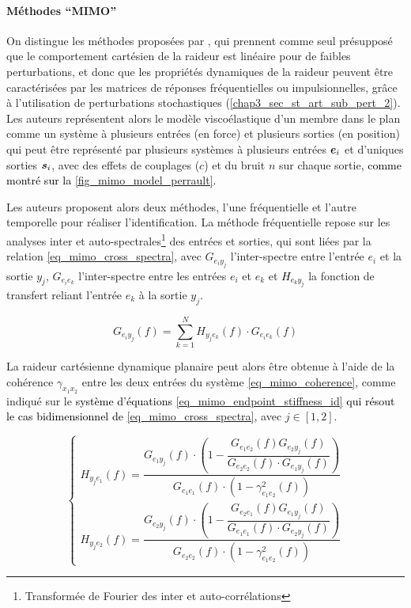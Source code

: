 \paragraph{Méthodes \foreignquote{french}{MIMO} }

On distingue les méthodes proposées par \textcite{perreault_multiple-input_1999,perreault_effects_2001}, qui prennent comme seul présupposé que le comportement cartésien de la raideur est linéaire pour de faibles perturbations, et donc que les propriétés dynamiques de la raideur peuvent être caractérisées par les matrices de réponses fréquentielles ou impulsionnelles, grâce à l'utilisation de perturbations stochastiques (\cref{chap3_sec_st_art_sub_pert_2}). Les auteurs représentent alors le modèle viscoélastique d'un membre dans le plan comme un système à plusieurs entrées (en force) et plusieurs sorties (en position) qui peut être représenté par plusieurs systèmes à plusieurs entrées $\vect{e}_i$ et d'uniques sorties $\vect{s}_i$, avec des effets de couplages ($c$) et du bruit $n$ sur chaque sortie\textcolor{black}{, comme montré sur la \cref{fig_mimo_model_perrault}.}

\tikzexternalenable


Les auteurs proposent alors deux méthodes, l'une fréquentielle et l'autre temporelle pour réaliser l'identification. La méthode fréquentielle repose sur les analyses inter et auto-spectrales\footnote{Transformée de Fourier des inter et auto-corrélations} des entrées et sorties, qui sont liées par la relation \cref{eq_mimo_cross_spectra}, avec $G_{e_iy_j}$ l'inter-spectre entre l'entrée $e_i$ et la sortie $y_j$, $G_{e_ie_k}$ l'inter-spectre entre les entrées $e_i$ et $e_k$ et \textcolor{black}{$H_{e_ky_j}$} la fonction de transfert reliant l'entrée $e_k$ à la sortie $y_j$. 

\begin{equation}\label{eq_mimo_cross_spectra}
G_{e_iy_j}(f) = \sum_{k=1}^{N}H_{y_je_k}(f)\cdot G_{e_ie_k}(f)
\end{equation}

La raideur cartésienne dynamique planaire peut alors être obtenue à l'aide de la cohérence $\gamma_{x_1x_2}$ entre les deux entrées du système \cref{eq_mimo_coherence}, comme indiqué sur le \textcolor{black}{système d'équations \cref{eq_mimo_endpoint_stiffness_id} qui résout le cas bidimensionnel de \cref{eq_mimo_cross_spectra},} avec $j \in [1,2]$.

\begin{equation}\label{eq_mimo_endpoint_stiffness_id}
	\begin{cases}
		H_{y_je_1}(f) = \dfrac{G_{e_1y_j}(f)\cdot \left(1 - \dfrac{G_{e_1e_2}(f)G_{e_2y_j}(f)}{G_{e_2e_2}(f)\cdot G_{e_1y_j}(f)} \right)}{G_{e_1e_1}(f)\cdot \left( 1 - \gamma^2_{e_1e_2}(f)\right)} \\[5mm]
		H_{y_je_2}(f) = \dfrac{G_{e_2y_j}(f)\cdot \left(1 - \dfrac{G_{e_2e_1}(f)G_{e_1y_j}(f)}{G_{e_1e_1}(f)\cdot G_{e_2y_j}(f)} \right)}{G_{e_2e_2}(f)\cdot \left( 1 - \gamma^2_{e_1e_2}(f)\right)}
	\end{cases}
\end{equation}

